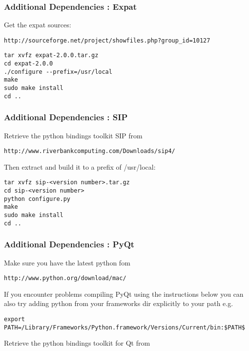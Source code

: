\subsubsection{Additional Dependencies : Expat}
Get the expat sources:

\begin{verbatim}
http://sourceforge.net/project/showfiles.php?group_id=10127 
\end{verbatim}

\begin{verbatim}
tar xvfz expat-2.0.0.tar.gz 
cd expat-2.0.0 
./configure --prefix=/usr/local
make 
sudo make install 
cd ..  
\end{verbatim}

\subsubsection{Additional Dependencies : SIP}
Retrieve the python bindings toolkit SIP from

\begin{verbatim}
http://www.riverbankcomputing.com/Downloads/sip4/
\end{verbatim}

Then extract and build it to a prefix of /usr/local:

\begin{verbatim}
tar xvfz sip-<version number>.tar.gz 
cd sip-<version number>
python configure.py 
make 
sudo make install 
cd ..  
\end{verbatim}

\subsubsection{Additional Dependencies : PyQt}
Make sure you have the latest python fom 

\begin{verbatim}
http://www.python.org/download/mac/
\end{verbatim}

If you encounter problems compiling PyQt using the instructions 
below you can also try adding python from your frameworks dir
explicitly to your path e.g.

\begin{verbatim}
export PATH=/Library/Frameworks/Python.framework/Versions/Current/bin:$PATH$
\end{verbatim}

Retrieve the python bindings toolkit for Qt from

